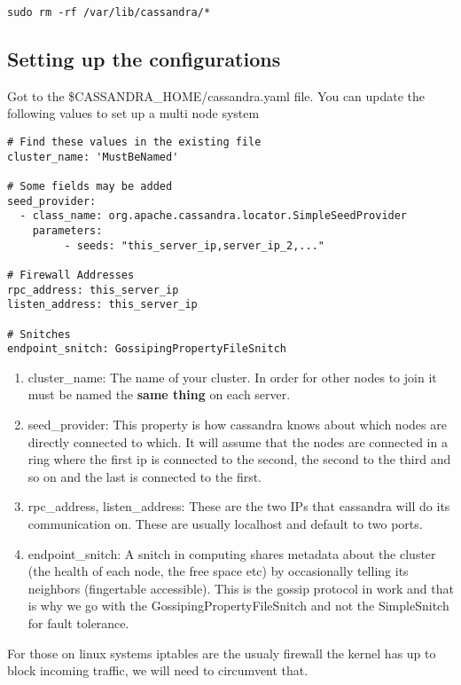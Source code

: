 \documentclass[9pt,twocolumn,twoside]{idsi}
\begin{document}
\begin{lstlisting}[breaklines]
sudo rm -rf /var/lib/cassandra/*
\end{lstlisting}

\subsection{Setting up the configurations}

Got to the \$CASSANDRA\_HOME/cassandra.yaml file. You can update the following values to set up a multi node system

\begin{lstlisting}[breaklines]
# Find these values in the existing file
cluster_name: 'MustBeNamed'

# Some fields may be added
seed_provider:
  - class_name: org.apache.cassandra.locator.SimpleSeedProvider
    parameters:
         - seeds: "this_server_ip,server_ip_2,..."

# Firewall Addresses
rpc_address: this_server_ip
listen_address: this_server_ip

# Snitches
endpoint_snitch: GossipingPropertyFileSnitch

\end{lstlisting}

\begin{enumerate}
\item cluster\_name: The name of your cluster. In order for other nodes to join it must be named the \textbf{same thing} on each server.
\item seed\_provider: This property is how cassandra knows about which nodes are directly connected to which. It will assume that the nodes are connected in a ring where the first ip is connected to the second, the second to the third and so on and the last is connected to the first.
\item rpc\_address, listen\_address: These are the two IPs that cassandra will do its communication on. These are usually localhost and default to two ports.
\item endpoint\_snitch: A snitch in computing shares metadata about the cluster (the health of each node, the free space etc) by occasionally telling its neighbors (fingertable accessible). This is the gossip protocol in work and that is why we go with the GossipingPropertyFileSnitch and not the SimpleSnitch for fault tolerance.
\end{enumerate}

For those on linux systems iptables are the usualy firewall the kernel has up to block incoming traffic, we will need to circumvent that.
\end{document}

